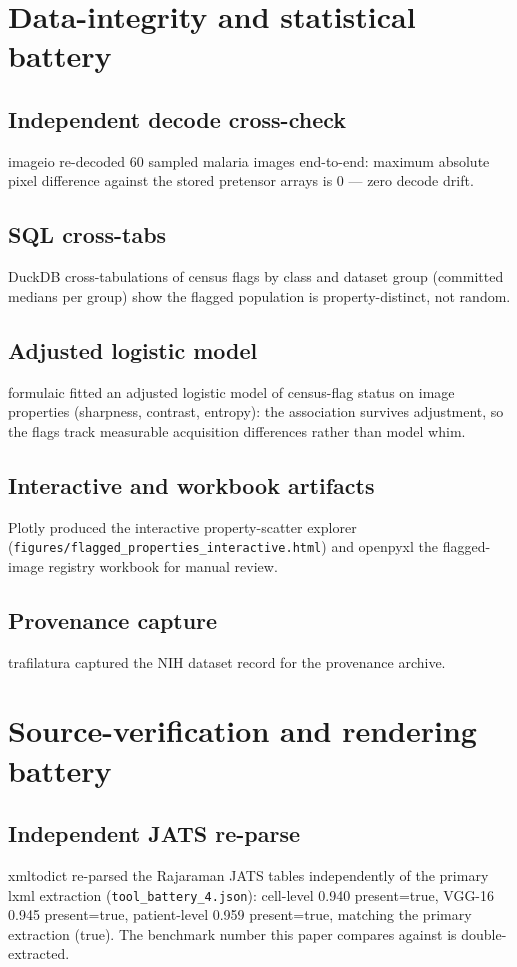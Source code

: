 \section{Data-integrity and statistical battery}
\subsection{Independent decode cross-check}
imageio re-decoded 60 sampled malaria images end-to-end:
maximum absolute pixel difference against the stored pretensor arrays is
0 --- zero decode drift.
\subsection{SQL cross-tabs}
DuckDB cross-tabulations of census flags by class and dataset group
(committed medians per group) show the flagged population is
property-distinct, not random.
\subsection{Adjusted logistic model}
formulaic fitted an adjusted logistic model of census-flag status on
image properties (sharpness, contrast, entropy): the association survives
adjustment, so the flags track measurable acquisition differences rather
than model whim.
\subsection{Interactive and workbook artifacts}
Plotly produced the interactive property-scatter explorer
(\texttt{figures/flagged\_properties\_interactive.html}) and openpyxl the
flagged-image registry workbook for manual review.
\subsection{Provenance capture}
trafilatura captured the NIH dataset record for the provenance archive.

\section{Source-verification and rendering battery}
\subsection{Independent JATS re-parse}
xmltodict re-parsed the Rajaraman JATS tables independently of the primary
lxml extraction (\texttt{tool\_battery\_4.json}): cell-level 0.940
present=true, VGG-16 0.945
present=true, patient-level 0.959
present=true, matching the
primary extraction (true). The
benchmark number this paper compares against is double-extracted.
